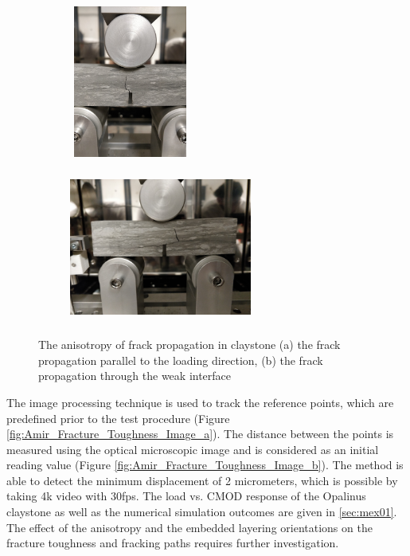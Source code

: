 \begin{figure}[!ht]
\centering
\begin{subfigure}[c]{0.43\textwidth}
\centering
\includegraphics[width=4cm,height=5cm]{figures/Amir_Fracture_Toughness_Fracture_a.png}
\subcaption{}
\label{fig:Amir_Fracture_Toughness_Fracture_a}
\end{subfigure}
\hfill
\begin{subfigure}[c]{0.55\textwidth}
\centering
\includegraphics[width=6cm,height=5cm]{figures/Amir_Fracture_Toughness_Fracture_b.png}
\subcaption{}
\label{fig:Amir_Fracture_Toughness_Fracture_b}
\end{subfigure}
\caption{The anisotropy of frack propagation in claystone (a) the frack propagation parallel to the loading direction, (b) the frack propagation through the weak interface}
\end{figure}

The image processing technique is used to track the reference points, which are predefined prior to the test procedure (Figure \ref{fig:Amir_Fracture_Toughness_Image_a}). The distance between the points is measured using the optical microscopic image and is considered as an initial reading value (Figure \ref{fig:Amir_Fracture_Toughness_Image_b}). The method is able to detect the minimum displacement of 2 micrometers, which is possible by taking 4k video with 30fps. The load vs. CMOD response of the Opalinus claystone as well as the numerical simulation outcomes are given in \ref{sec:mex01}. The effect of the anisotropy and the embedded layering orientations on the fracture toughness and fracking paths requires further investigation. 

